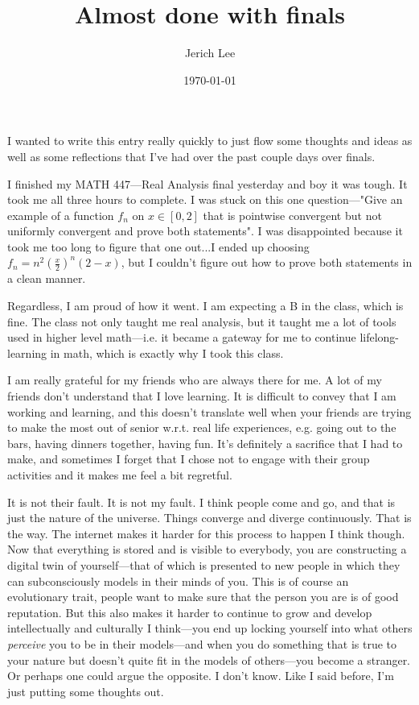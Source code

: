 \documentclass[12pt]{article}
\title{Almost done with finals}
\author{Jerich Lee}
\date{\today}
\theoremstyle{definition} %
\theoremstyle{plain} %
\begin{document}
\maketitle
I wanted to write this entry really quickly to just flow some thoughts and ideas as well as some reflections that I've had over the past couple days over finals.

I finished my MATH 447—Real Analysis final yesterday and boy it was tough. It took me all three hours to complete. I was stuck on this one question—"Give an example of a function $f_{n}$ on $x \in [0,2]$ that is pointwise convergent but not uniformly convergent and prove both statements". I was disappointed because it took me too long to figure that one out...I ended up choosing  
$f_{n}=n^{2}(\frac{x}{2})^{n}(2-x)$, but I couldn't figure out how to prove both statements in a clean manner.

Regardless, I am proud of how it went. I am expecting a B in the class, which is fine. The class not only taught me real analysis, but it taught me a lot of tools used in higher level math—i.e. it became a gateway for me to continue lifelong-learning in math, which is exactly why I took this class.

I am really grateful for my friends who are always there for me. A lot of my friends don't understand that I love learning. It is difficult to convey that I am working and learning, and this doesn't translate well when your friends are trying to make the most out of senior w.r.t. real life experiences, e.g. going out to the bars, having dinners together, having fun. It's definitely a sacrifice that I had to make, and sometimes I forget that I chose not to engage with their group activities and it makes me feel a bit regretful. 

It is not their fault. It is not my fault. I think people come and go, and that is just the nature of the universe. Things converge and diverge continuously. That is the way. The internet makes it harder for this process to happen I think though. Now that everything is stored and is visible to everybody, you are constructing a digital twin of yourself—that of which is presented to new people in which they can subconsciously models in their minds of you. This is of course an evolutionary trait, people want to make sure that the person you are is of good reputation. But this also makes it harder to continue to grow and develop intellectually and culturally I think—you end up locking yourself into what others \emph{perceive} you to be in their models—and when you do something that is true to your nature but doesn't quite fit in the models of others—you become a stranger. Or perhaps one could argue the opposite. I don't know. Like I said before, I'm just putting some thoughts out. 
\end{document}

